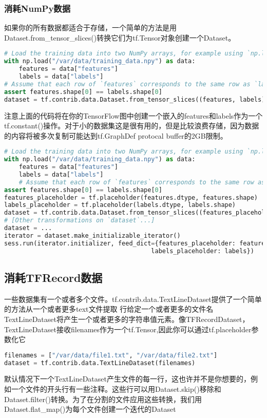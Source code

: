 \subsubsection{消耗NumPy数据}
如果你的所有数据都适合于存储，一个简单的方法是用Dataset.from\_tensor\_slices()转换它们为tf.Tensor对象创建一个Dataset。
\begin{lstlisting}[language=Python]
# Load the training data into two NumPy arrays, for example using `np.load()`.
with np.load("/var/data/training_data.npy") as data:
    features = data["features"]
    labels = data["labels"]
# Assume that each row of `features` corresponds to the same row as `labels`.
assert features.shape[0] == labels.shape[0]
dataset = tf.contrib.data.Dataset.from_tensor_slices((features, labels))
\end{lstlisting}
注意上面的代码将在你的TensorFlow图中创建一个嵌入的features和labels作为一个tf.constant()操作。对于小的数据集这是很有用的，但是比较浪费存储，因为数据的内容将被多次复制可能达到tf.GraphDef protocal buffer的2GB限制。
\begin{lstlisting}[language=Python]
# Load the training data into two NumPy arrays, for example using `np.load()`.
with np.load("/var/data/training_data.npy") as data:
    features = data["features"]
    labels = data["labels"]
    # Assume that each row of `features` corresponds to the same row as `labels`.
assert features.shape[0] == labels.shape[0]
features_placeholder = tf.placeholder(features.dtype, features.shape)
labels_placeholder = tf.placeholder(labels.dtype, labels.shape)
dataset = tf.contrib.data.Dataset.from_tensor_slices((features_placeholder, labels_placeholder))
# [Other transformations on `dataset`...]
dataset = ...
iterator = dataset.make_initializable_iterator()
sess.run(iterator.initializer, feed_dict={features_placeholder: features,
                                        labels_placeholder: labels})
\end{lstlisting}
\subsection{消耗TFRecord数据}
一些数据集有一个或者多个文件。tf.contrib.data.TextLineDataset提供了一个简单的方法从一个或者更多text文件提取
行给定一个或者更多的文件名TextLineDataset将产生一个或者更多的字符串值元素。像TFRecordDataset，TextLineDataset接收filenames作为一个tf.Tensor,因此你可以通过tf.placeholder参数化它
\begin{lstlisting}[language=Python]
filenames = ["/var/data/file1.txt", "/var/data/file2.txt"]
dataset = tf.contrib.data.TextLineDataset(filenames)
\end{lstlisting}
默认情况下一个TextLineDataset产生文件的每一行，这也许并不是你想要的，例如一个文件的开头行有一些注释。这些行可以用Dataset.skip()移除和Dataset.filter()转换。为了在分割的文件应用这些转换，我们用Dataset.flat\_map()为每个文件创建一个迭代的Dataset

